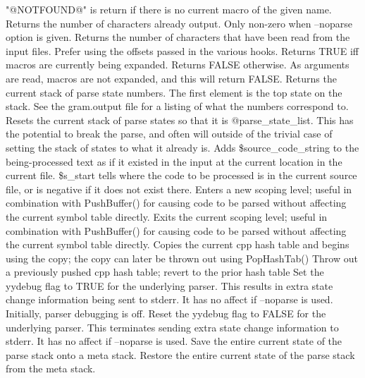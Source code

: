 "@NOTFOUND@" is return if there is no current macro of the given name.
Returns the number of characters already output.  Only non-zero when 
--noparse option is given.
Returns the number of characters that have been read from the
input files.  Prefer using the offsets passed in the various hooks.
Returns TRUE iff macros are currently being expanded.
Returns FALSE otherwise.  As arguments are read, macros are not expanded,
and this will return FALSE.
Returns the current stack of parse state numbers.  The first element is
the top state on the stack.  See the gram.output
file for a listing of what the numbers correspond to.
Resets the current stack of parse states so that it is @parse\_\-state\_\-list.
This has the potential to break the parse, and often will outside
of the trivial case of setting the stack of states to what it already is.
Adds \$source\_\-code\_\-string to the being-processed text 
as if it existed in the input at the
current location in the current file. \$s\_\-start tells
where the code to be processed is in the current source
file, or is negative if it does not exist there.
Enters a new scoping level; useful in combination
with PushBuffer() for causing code to be parsed without
affecting the current symbol table directly.
Exits the current scoping level; useful in combination
with PushBuffer() for causing code to be parsed without
affecting the current symbol table directly.
Copies the current cpp hash table and begins using the copy;  the copy
can later be thrown out using PopHashTab()
Throw out a previously pushed cpp hash table; revert to the prior
hash table
Set the yydebug flag to TRUE for the underlying parser.
This results in extra state change information being sent to stderr.
It has no affect if --noparse is used.  Initially, parser debugging is off.
Reset the yydebug flag to FALSE for the underlying parser.  
This terminates sending extra state change information to stderr.
It has no affect if --noparse is used.
Save the entire current state of the parse stack onto a meta stack.
Restore the entire current state of the parse stack from the meta stack.
